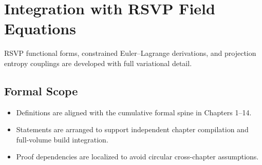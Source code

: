 \documentclass[../../clio.tex]{subfiles}
\begin{document}
\chapter{Integration with RSVP Field Equations}
\label{apx:g-rsvp-integration}

RSVP functional forms, constrained Euler--Lagrange derivations, and projection entropy couplings are developed with full variational detail.

\section{Formal Scope}
\begin{itemize}
  \item Definitions are aligned with the cumulative formal spine in Chapters 1--14.
  \item Statements are arranged to support independent chapter compilation and full-volume build integration.
  \item Proof dependencies are localized to avoid circular cross-chapter assumptions.
\end{itemize}
\end{document}
